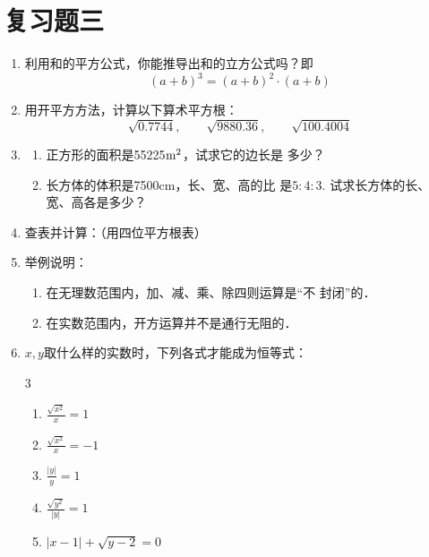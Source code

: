 \section*{复习题三}
\begin{enumerate}
    \item 利用和的平方公式，你能推导出和的立方公式吗？即
    \[(a+b)^3=(a+b)^2\cdot (a+b)\]
    \item 用开平方方法，计算以下算术平方根：
    $$\sqrt{0.7744},\qquad \sqrt{9880.36},\qquad \sqrt{100.4004}$$
  \item 
    \begin{enumerate}
        \item 正方形的面积是55225${\rm m^2}$，试求它的边长是
多少？
\item 长方体的体积是7500cm，长、宽、高的比
是$5:4:3$. 试求长方体的长、宽、高各是多少？
    \end{enumerate}
    
    
\item 查表并计算：（用四位平方根表）
\begin{enumerate}
\end{enumerate}

\item 举例说明：
\begin{enumerate}
    \item 在无理数范围内，加、减、乘、除四则运算是“不
封闭”的．
\item 在实数范围内，开方运算并不是通行无阻的．
\end{enumerate}

\item $x,y$取什么样的实数时，下列各式才能成为恒等式：
\begin{multicols}{3}
    \begin{enumerate}
        \item $\frac{\sqrt{x^2}}{x}=1$
        \item $\frac{\sqrt{x^2}}{x}=-1$
        \item $\frac{|y|}{y}=1$
        \item $\frac{\sqrt{y^2}}{|y|}=1$
        \item $|x-1|+\sqrt{y-2}=0$
    \end{enumerate}
\end{multicols}




\end{enumerate}
